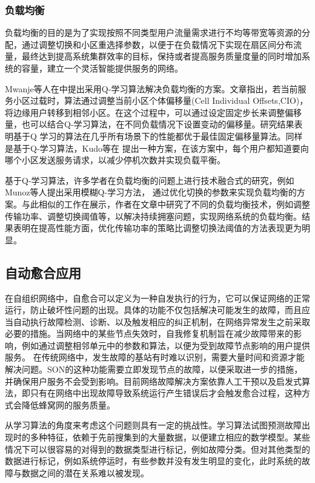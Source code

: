 \documentclass{IEEEtran}
\begin{document}
\subsubsection{负载均衡}

负载均衡的目的是为了实现按照不同类型用户流量需求进行不均等带宽等资源的分配，通过调整切换和小区重选择参数，以便于在负载情况下实现在扇区间分布流量，最终达到提高系统集群效率的目标，保持或者提高服务质量度量的同时增加系统的容量，建立一个灵活智能提供服务的网络。


Mwanje等人在\cite{Mwanje2013}中提出采用Q-学习算法解决负载均衡的方案。文章指出，若当前服务小区过载时，算法通过调整当前小区个体偏移量(Cell Individual Offsets,CIO)，将边缘用户转移到相邻小区。在这个过程中，可以通过设定固定步长来调整偏移量，也可以结合Q-学习算法，在不同负载情况下设置变动的偏移量。研究结果表明基于Q 学习的算法在几乎所有场景下的性能都优于最佳固定偏移量算法。同样是基于Q-学习算法，Kudo等在\cite{Kudo2014} 提出一种方案，在该方案中，每个用户都知道要向哪个小区发送服务请求，以减少停机次数并实现负载平衡。

基于Q-学习算法，许多学者在负载均衡的问题上进行技术融合式的研究，例如Munoz等人\cite{Munoz2011}提出采用模糊Q-学习方法， 通过优化切换的参数来实现负载均衡的方案。与此相似的工作在\cite{Munoz2013}展示，作者在文章中研究了不同的负载均衡技术，例如调整传输功率、调整切换阈值等，以解决持续拥塞问题，实现网络系统的负载均衡。结果表明在提高性能方面，优化传输功率的策略比调整切换法阈值的方法表现更为明显。


\subsection{自动愈合应用}

在自组织网络中，自愈合可以定义为一种自发执行的行为，它可以保证网络的正常运行，防止破坏性问题的出现。具体的功能不仅包括解决可能发生的故障，而且应当自动执行故障检测、诊断、以及触发相应的纠正机制，在网络异常发生之前采取必要的措施。当网络中的某些节点失效时，自我修复机制旨在减少故障带来的影响，例如通过调整相邻单元中的参数和算法，以便为受到故障节点影响的用户提供服务。 在传统网络中，发生故障的基站有时难以识别，需要大量时间和资源才能解决问题。SON的这种功能需要立即发现节点的故障，以便采取进一步的措施，并确保用户服务不会受到影响。目前网络故障解决方案依靠人工干预以及启发式算法，即只有在网络中出现故障导致系统运行产生错误后才会触发愈合过程，这种方式会降低蜂窝网的服务质量。

从学习算法的角度来考虑这个问题则具有一定的挑战性。学习算法试图预测故障出现时的多种特征，依赖于先前搜集到的大量数据，以便建立相应的数学模型。某些情况下可以很容易的对得到的数据类型进行标记，例如故障分类。但对其他类型的数据进行标记，例如系统停运时，有些参数并没有发生明显的变化，此时系统的故障与数据之间的潜在关系难以被发现。
\end{document}

